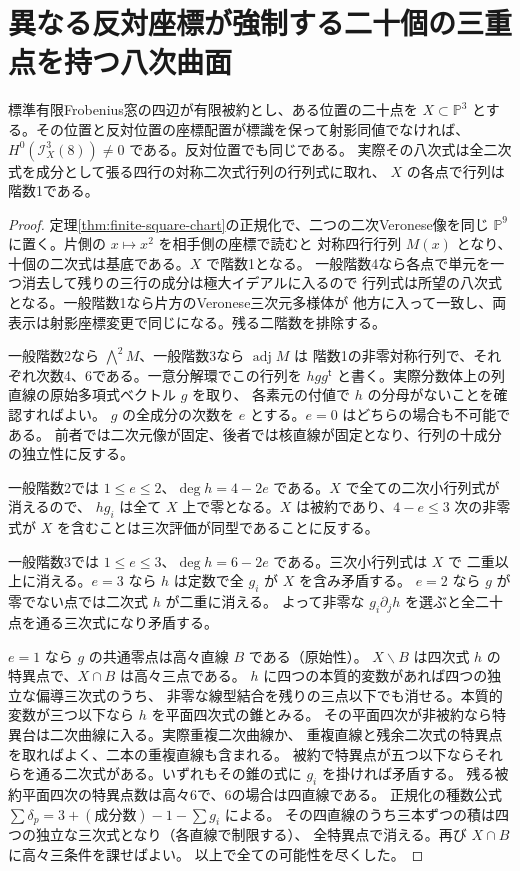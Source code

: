 \section{異なる反対座標が強制する二十個の三重点を持つ八次曲面}
\label{sec:opposite-root-triple-octics}
\begin{theorem}\label{thm:opposite-root-triple-octics}
標準有限Frobenius窓の四辺が有限被約とし、ある位置の二十点を
$X\subset\mathbb P^3$ とする。その位置と反対位置の座標配置が標識を保って射影同値でなければ、
$H^0(\mathcal I_X^3(8))\ne0$ である。反対位置でも同じである。
実際その八次式は全二次式を成分として張る四行の対称二次式行列の行列式に取れ、
$X$ の各点で行列は階数1である。
\end{theorem}
\begin{proof}
定理\ref{thm:finite-square-chart}の正規化で、二つの二次Veronese像を同じ
$\mathbb P^9$ に置く。片側の $x\mapsto x^2$ を相手側の座標で読むと
対称四行行列 $M(x)$ となり、十個の二次式は基底である。$X$ で階数1となる。
一般階数4なら各点で単元を一つ消去して残りの三行の成分は極大イデアルに入るので
行列式は所望の八次式となる。一般階数1なら片方のVeronese三次元多様体が
他方に入って一致し、両表示は射影座標変更で同じになる。残る二階数を排除する。

一般階数2なら $\bigwedge^2M$、一般階数3なら $\operatorname{adj}M$ は
階数1の非零対称行列で、それぞれ次数4、6である。一意分解環でこの行列を
$h g g^{\mathsf t}$ と書く。実際分数体上の列直線の原始多項式ベクトル $g$ を取り、
各素元の付値で $h$ の分母がないことを確認すればよい。
$g$ の全成分の次数を $e$ とする。$e=0$ はどちらの場合も不可能である。
前者では二次元像が固定、後者では核直線が固定となり、行列の十成分の独立性に反する。

一般階数2では $1\le e\le2$、$\deg h=4-2e$ である。$X$ で全ての二次小行列式が消えるので、
$h g_i$ は全て $X$ 上で零となる。$X$ は被約であり、$4-e\le3$ 次の非零式が
$X$ を含むことは三次評価が同型であることに反する。

一般階数3では $1\le e\le3$、$\deg h=6-2e$ である。三次小行列式は $X$ で
二重以上に消える。$e=3$ なら $h$ は定数で全 $g_i$ が $X$ を含み矛盾する。
$e=2$ なら $g$ が零でない点では二次式 $h$ が二重に消える。
よって非零な $g_i\partial_j h$ を選ぶと全二十点を通る三次式になり矛盾する。

$e=1$ なら $g$ の共通零点は高々直線 $B$ である（原始性）。
$X\smallsetminus B$ は四次式 $h$ の特異点で、$X\cap B$ は高々三点である。
$h$ に四つの本質的変数があれば四つの独立な偏導三次式のうち、
非零な線型結合を残りの三点以下でも消せる。本質的変数が三つ以下なら $h$ を平面四次式の錐とみる。
その平面四次が非被約なら特異台は二次曲線に入る。実際重複二次曲線か、
重複直線と残余二次式の特異点を取ればよく、二本の重複直線も含まれる。
被約で特異点が五つ以下ならそれらを通る二次式がある。いずれもその錐の式に $g_i$ を掛ければ矛盾する。
残る被約平面四次の特異点数は高々6で、6の場合は四直線である。
正規化の種数公式 $\sum\delta_p=3+(\text{成分数})-1-\sum g_i$ による。
その四直線のうち三本ずつの積は四つの独立な三次式となり（各直線で制限する）、
全特異点で消える。再び $X\cap B$ に高々三条件を課せばよい。
以上で全ての可能性を尽くした。
\end{proof}

